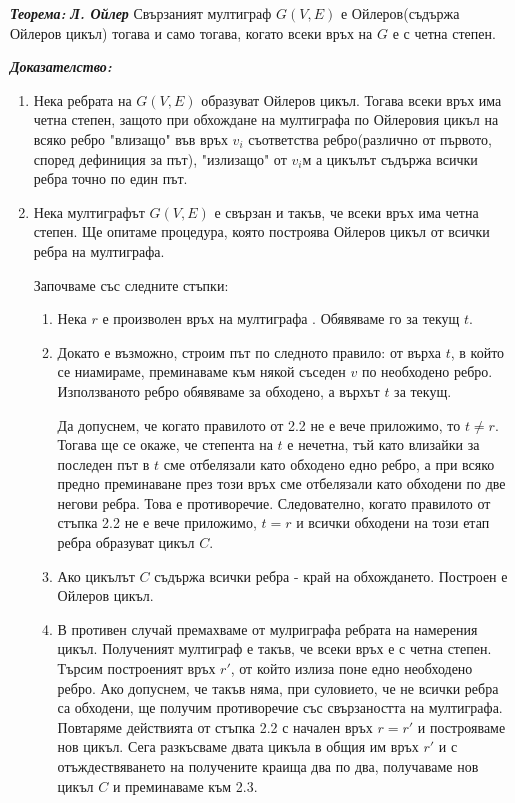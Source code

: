 \documentclass[11pt]{article} %
\newcommand{\italicBold}[1]{\textbf{\emph{#1}}}
\newcommand{\theorem}{\italicBold{Теорема: }}
\newcommand{\proof}{\italicBold{Доказателство: }}
\newcommand{\enumNum}{\renewcommand{\theenumi}{\arabic{enumi}}}
\begin{document}
\theorem \italicBold{Л. Ойлер} Свързаният мултиграф $G(V, E)$ е Ойлеров(съдържа Ойлеров цикъл) тогава и само тогава, когато всеки връх на $G$ е с четна степен. \par

\proof 

\enumNum
\begin{enumerate}
	\item Нека ребрата на $G(V, E)$ образуват Ойлеров цикъл. Тогава всеки връх има четна степен, защото при обхождане на мултиграфа по Ойлеровия цикъл на всяко ребро "влизащо" във връх $v_{i}$ съответства ребро(различно от първото, според дефиниция за път), "излизащо" от $v_{i}$м а цикълът съдържа всички ребра точно по един път.\\
	\item Нека мултиграфът $G(V, E)$ е свързан и такъв, че всеки връх има четна степен. Ще опитаме процедура, която построява Ойлеров цикъл от всички ребра на мултиграфа. \par 
		Започваме със следните стъпки:
		\begin{enumerate}[label*=\arabic*.]
    		\item Нека $r$ е произволен връх на мултиграфа . Обявяваме го за текущ $t$.\\
    		\item Докато е възможно, строим път по следното правило: от върха $t$, в който се ниамираме, преминаваме към някой съседен $v$ по необходено ребро. Използваното ребро обявяваме за обходено, а върхът $t$ за текущ. \par
    		Да допуснем, че когато правилото от 2.2 не е вече приложимо, то $t \neq r$. Тогава ще се окаже, че степента на $t$ е нечетна, тъй като влизайки за последен път в $t$ сме отбелязали като обходено едно ребро, а при всяко предно преминаване през този връх сме отбелязали като обходени по две негови ребра. Това е противоречие. Следователно, когато правилото от стъпка 2.2 не е вече приложимо, $t = r$ и всички обходени на този етап ребра образуват цикъл $C$. \\
    		\item Ако цикълът $C$ съдържа всички ребра - край на обхождането. Построен е Ойлеров цикъл. \\
    		\item В противен случай премахваме от мулриграфа ребрата на намерения цикъл. Полученият мултиграф е такъв, че всеки връх е с четна степен. Търсим построеният връх $r'$, от който излиза поне едно необходено ребро. Ако допуснем, че такъв няма, при суловието, че не всички ребра са обходени, ще получим противоречие със свързаността на мултиграфа. Повтаряме действията от стъпка 2.2 с начален връх $r = r'$ и построяваме нов цикъл. Сега разкъсваме двата цикъла в общия им връх $r'$ и с отъждествяването на получените краища два по два, получаваме нов цикъл $C$ и преминаваме към 2.3.    
  		\end{enumerate} 
\end{enumerate} \par
\end{document}
